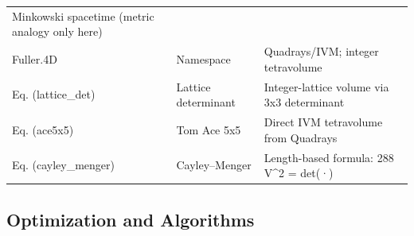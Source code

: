 \documentclass[
  10pt,
]{article}
\begin{document}
\begin{longtable}[]{@{}lll@{}}
\begin{minipage}[t]{0.30\columnwidth}
Minkowski spacetime (metric analogy only here)\strut
\end{minipage}\tabularnewline
\begin{minipage}[t]{0.30\columnwidth}\raggedright
Fuller.4D\strut
\end{minipage} & \begin{minipage}[t]{0.30\columnwidth}\raggedright
Namespace\strut
\end{minipage} & \begin{minipage}[t]{0.30\columnwidth}\raggedright
Quadrays/IVM; integer tetravolume\strut
\end{minipage}\tabularnewline
\begin{minipage}[t]{0.30\columnwidth}\raggedright
Eq. (lattice\_det)\strut
\end{minipage} & \begin{minipage}[t]{0.30\columnwidth}\raggedright
Lattice determinant\strut
\end{minipage} & \begin{minipage}[t]{0.30\columnwidth}\raggedright
Integer-lattice volume via 3x3 determinant\strut
\end{minipage}\tabularnewline
\begin{minipage}[t]{0.30\columnwidth}\raggedright
Eq. (ace5x5)\strut
\end{minipage} & \begin{minipage}[t]{0.30\columnwidth}\raggedright
Tom Ace 5x5\strut
\end{minipage} & \begin{minipage}[t]{0.30\columnwidth}\raggedright
Direct IVM tetravolume from Quadrays\strut
\end{minipage}\tabularnewline
\begin{minipage}[t]{0.30\columnwidth}\raggedright
Eq. (cayley\_menger)\strut
\end{minipage} & \begin{minipage}[t]{0.30\columnwidth}\raggedright
Cayley--Menger\strut
\end{minipage} & \begin{minipage}[t]{0.30\columnwidth}\raggedright
Length-based formula: 288 V\^{}2 = det(·)\strut
\end{minipage}\tabularnewline
\bottomrule
\end{longtable}

\hypertarget{optimization-and-algorithms}{%
\subsection{Optimization and
Algorithms}\label{optimization-and-algorithms}}
\end{document}
